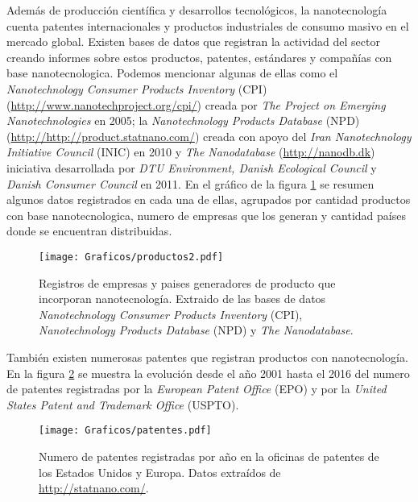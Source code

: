 	Además de producción científica y desarrollos tecnológicos, la nanotecnología cuenta patentes internacionales y productos industriales de consumo masivo en el mercado global. Existen bases de datos que registran la actividad del sector creando informes sobre estos productos, patentes, estándares y compañías con base nanotecnologica. Podemos mencionar algunas de ellas como el \textit{Nanotechnology Consumer Products Inventory} (CPI) (\url{http://www.nanotechproject.org/cpi/}) creada por \textit{The Project on Emerging Nanotechnologies} en 2005\cite{Vance2015}; la \textit{Nanotechnology Products Database} (NPD) (\url{http://http://product.statnano.com/}) creada con apoyo del \textit{Iran Nanotechnology Initiative Council} (INIC) en 2010 y \textit{The Nanodatabase} (\url{http://nanodb.dk}) iniciativa desarrollada por \textit{DTU Environment, Danish Ecological Council} y \textit{Danish Consumer Council} en 2011. En el gráfico de la figura \ref{fig:productos} se resumen algunos datos registrados en cada una de ellas, agrupados por cantidad productos con base nanotecnologica, numero de empresas que los generan y cantidad países donde se encuentran distribuidas.

		\begin{figure}[ht!]
 			\begin{center}
 			\texttt{[image: Graficos/productos2.pdf]}
 			\caption[Cantidad de productos, compañías y origen con base nanotecnologica]{Registros de empresas y paises generadores de producto que incorporan nanotecnología. Extraido de las bases de datos \textit{Nanotechnology Consumer Products Inventory} (CPI), \textit{Nanotechnology Products Database} (NPD) y \textit{The Nanodatabase}.}
 			\label{fig:productos}
 		    \end{center}
 		    \end{figure}

 	También existen numerosas patentes que registran productos con nanotecnología. En la figura \ref{fig:patentes} se muestra la evolución desde el año 2001 hasta el 2016 del numero de patentes registradas por la \textit{European Patent Office} (EPO) y por la \textit{United States Patent and Trademark Office} (USPTO).

		\begin{figure}[ht!]
 			\begin{center}
 			\texttt{[image: Graficos/patentes.pdf]}
 			\caption[Numero de patentes de productos en base nanotecnologica]{Numero de patentes registradas por año en la oficinas de patentes de los Estados Unidos y Europa. Datos extraídos de \url{http://statnano.com/}.}
 			\label{fig:patentes}
 		    \end{center}
 		    \end{figure}

